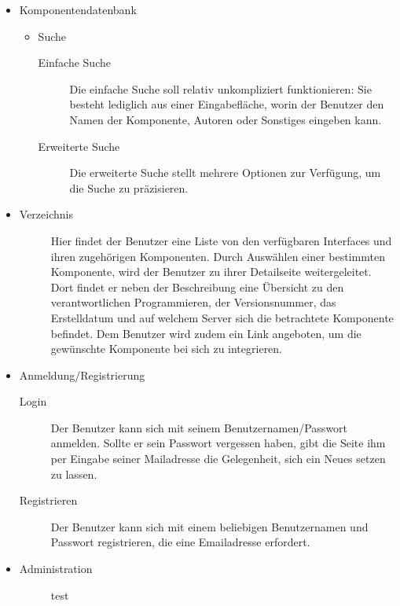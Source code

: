  \begin{itemize}
   \item Komponentendatenbank
   \begin{itemize}
    \item Suche
      \begin{description}
       \item[Einfache Suche] Die einfache Suche soll relativ unkompliziert funktionieren:
        Sie besteht lediglich aus einer Eingabefläche, worin der Benutzer
       den Namen der Komponente, Autoren oder Sonstiges eingeben kann. 
       \item[Erweiterte Suche] Die erweiterte Suche stellt mehrere Optionen zur Verfügung, um die Suche zu präzisieren. 
       \end{description}
    \end{itemize}
    \item Verzeichnis
      \begin{description}
        \item[] Hier findet der Benutzer eine Liste von den verfügbaren Interfaces und ihren zugehörigen Komponenten.
        Durch Auswählen einer bestimmten Komponente, wird der Benutzer zu ihrer Detailseite weitergeleitet.
        Dort findet er neben der Beschreibung eine Übersicht zu den verantwortlichen Programmieren, der Versionsnummer, das Erstelldatum und auf welchem Server sich die betrachtete Komponente befindet. 
        Dem Benutzer wird zudem ein Link angeboten, um die gewünschte Komponente bei sich zu integrieren. 
      \end{description} 

    \item Anmeldung/Registrierung
      \begin{description}
        \item[Login] Der Benutzer kann sich mit seinem Benutzernamen/Passwort anmelden. Sollte er sein Passwort vergessen haben, gibt die Seite ihm per Eingabe seiner Mailadresse die Gelegenheit, sich ein Neues setzen zu lassen.
        \item[Registrieren]Der Benutzer kann sich mit einem beliebigen Benutzernamen und Passwort registrieren, die eine Emailadresse erfordert. 
      \end{description}   
    
    \item Administration
      \begin{description}
        \item[] test
      \end{description}
 \end{itemize}
 
